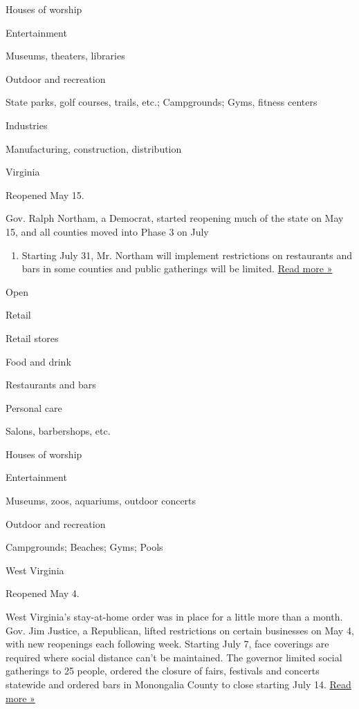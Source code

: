 Houses of worship

Entertainment

Museums, theaters, libraries

Outdoor and recreation

State parks, golf courses, trails, etc.; Campgrounds; Gyms, fitness
centers

Industries

Manufacturing, construction, distribution

Virginia

Reopened May 15.

Gov. Ralph Northam, a Democrat, started reopening much of the state on
May 15, and all counties moved into Phase 3 on July

\begin{enumerate}
\def\labelenumi{\arabic{enumi}.}
\tightlist
\item
  Starting July 31, Mr. Northam will implement restrictions on
  restaurants and bars in some counties and public gatherings will be
  limited.
  \href{https://www.wsls.com/news/2020/06/30/bar-seating-will-be-prohibited-in-virginia-restaurants-during-phase-3-gov-northam-says/}{Read
  more »}
\end{enumerate}

Open

Retail

Retail stores

Food and drink

Restaurants and bars

Personal care

Salons, barbershops, etc.

Houses of worship

Entertainment

Museums, zoos, aquariums, outdoor concerts

Outdoor and recreation

Campgrounds; Beaches; Gyms; Pools

West Virginia

Reopened May 4.

West Virginia's stay-at-home order was in place for a little more than a
month. Gov. Jim Justice, a Republican, lifted restrictions on certain
businesses on May 4, with new reopenings each following week. Starting
July 7, face coverings are required where social distance can't be
maintained. The governor limited social gatherings to 25 people, ordered
the closure of fairs, festivals and concerts statewide and ordered bars
in Monongalia County to close starting July 14.
\href{https://www.wvnstv.com/top-stories/coming-soon-wv-covid-19-update-july-13-2020/}{Read
more »}

